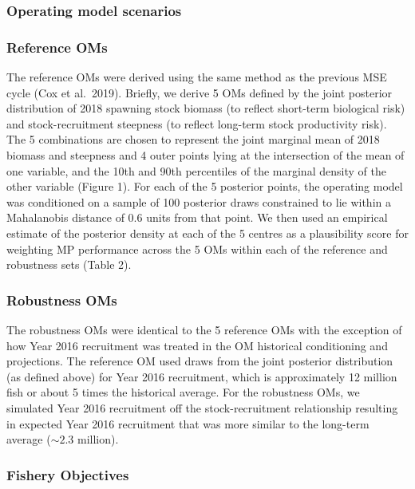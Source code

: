 \documentclass[11pt]{book}
\begin{document}
\hypertarget{operating-model-scenarios}{%
\subsubsection{Operating model scenarios}\label{operating-model-scenarios}}

\hypertarget{reference-oms}{%
\subsubsection{Reference OMs}\label{reference-oms}}

The reference OMs were derived using the same method as the previous MSE cycle (Cox et al.~2019). Briefly, we derive 5 OMs defined by the joint posterior distribution of 2018 spawning stock biomass (to reflect short-term biological risk) and stock-recruitment steepness (to reflect long-term stock productivity risk). The 5 combinations are chosen to represent the joint marginal mean of 2018 biomass and steepness and 4 outer points lying at the intersection of the mean of one variable, and the 10th and 90th percentiles of the marginal density of the other variable (Figure 1). For each of the 5 posterior points, the operating model was conditioned on a sample of 100 posterior draws constrained to lie within a Mahalanobis distance of 0.6 units from that point. We then used an empirical estimate of the posterior density at each of the 5 centres as a plausibility score for weighting MP performance across the 5 OMs within each of the reference and robustness sets (Table 2).

\hypertarget{robustness-oms}{%
\subsubsection{Robustness OMs}\label{robustness-oms}}

The robustness OMs were identical to the 5 reference OMs with the exception of how Year 2016 recruitment was treated in the OM historical conditioning and projections. The reference OM used draws from the joint posterior distribution (as defined above) for Year 2016 recruitment, which is approximately 12 million fish or about 5 times the historical average. For the robustness OMs, we simulated Year 2016 recruitment off the stock-recruitment relationship resulting in expected Year 2016 recruitment that was more similar to the long-term average (\(\sim 2.3\) million).

\hypertarget{fishery-objectives}{%
\subsubsection{Fishery Objectives}\label{fishery-objectives}}
\end{document}
